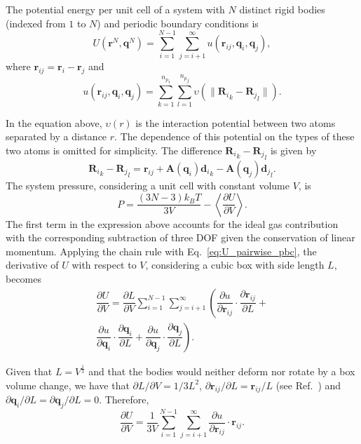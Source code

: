 \documentclass[aip,jcp,reprint,amsmath,amssymb]{revtex4-1}
\newcommand{\mt}[1]{\boldsymbol{\mathbf{#1}}}           %
\newcommand{\vt}[1]{\boldsymbol{\mathbf{#1}}}           %
\newcommand{\diff}[2]{\dfrac{\partial #1}{\partial #2}} %
\begin{document}
The potential energy per unit cell of a system with $N$ distinct rigid bodies (indexed from $1$ to $N$) and periodic boundary conditions is
\begin{equation}
\label{eq:U_pairwise_pbc}
U({\vt r}^N, {\vt q}^N) = \sum_{i=1}^{N-1} \sum_{j=i+1}^{\infty} u({\vt r}_{ij},{\vt q}_i,{\vt q}_j),
\end{equation}
where ${\vt r}_{ij} = {\vt r}_i - {\vt r}_j$ and
\begin{equation}
\label{eq:u_rigid_body_pair}
u({\vt r}_{ij},{\vt q}_i,{\vt q}_j) = \sum_{k=1}^{{n_p}_i} \sum_{l=1}^{{n_p}_j} \upsilon \left( \|{{\vt R}_i}_k - {{\vt R}_j}_l\| \right).
\end{equation}

In the equation above, $\upsilon(r)$ is the interaction potential between two atoms separated by a distance $r$. The dependence of this potential on the types of these two atoms is omitted for simplicity. The difference ${{\vt R}_i}_k - {{\vt R}_j}_l$ is given by
\[
{{\vt R}_i}_k - {{\vt R}_j}_l = {\vt r}_{ij} + {\mt A}({\vt q}_i){{\vt d}_i}_k - {\mt A}({\vt q}_j){{\vt d}_j}_l.
\]
The system pressure, considering a unit cell with constant volume $V$, is\cite{Louwerse2006,Tuckerman2010}
\[
P = \frac{(3N-3) k_B T}{3V} - \left\langle \diff{U}{V} \right\rangle.
\]
The first term in the expression above accounts for the ideal gas contribution with the corresponding subtraction of three DOF given the conservation of linear momentum. 
Applying the chain rule with Eq.~\ref{eq:U_pairwise_pbc}, the derivative of $U$ with respect to $V$, considering a cubic box with side length $L$, becomes
\begin{equation}
\begin{split}
\diff{U}{V} = \diff{L}{V} \sum_{i=1}^{N-1} \sum_{j=i+1}^{\infty} \left( \diff{u}{{\vt r}_{ij}} \cdot \diff{{\vt r}_{ij}}{L} + \right. \\ \left. \diff{u}{{\vt q}_i} \cdot \diff{{\vt q}_i}{L} + \diff{u}{{\vt q}_j} \cdot \diff{{\vt q}_j}{L}\right).
\end{split}
\end{equation}

Given that $L = V^\frac{1}{3}$ and that the bodies would neither deform nor rotate by a box volume change, we have that $\partial L / \partial V = 1/3L^2$, $\partial {\vt r}_{ij}/\partial L = {\vt r}_{ij}/L$ (see Ref.~) and $\partial {\vt q}_i / \partial L = \partial {\vt q}_j / \partial L = 0$. Therefore,
\[
\diff{U}{V} = \frac{1}{3V} \sum_{i=1}^{N-1} \sum_{j=i+1}^{\infty} \diff{u}{{\vt r}_{ij}} \cdot {\vt r}_{ij}.
\]
\end{document}
